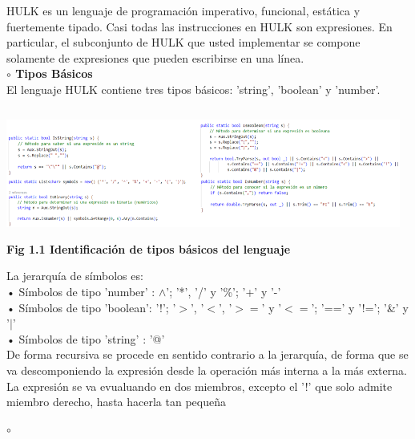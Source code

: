 \documentclass[letterpaper]{article}
\begin{document}
\newpage
{\small
HULK es un lenguaje de programación imperativo, funcional, estática y fuertemente tipado. Casi todas las instrucciones en HULK son expresiones. 
En particular, el subconjunto de HULK que usted implementar se compone solamente de expresiones que pueden escribirse en una línea. \\

\textbf{{\large $\circ $  Tipos Básicos}}\\

El lenguaje HULK contiene tres tipos básicos: 'string', 'boolean' y 'number'.

\begin{center}
	\includegraphics[width=13cm, height=4.25cm]{Imagenes/Types.png}\\
	{\scriptsize \textbf{Fig 1.1 Identificación de tipos básicos del lenguaje}}
\end{center}

La jerarquía de símbolos es: \\
• Símbolos de tipo 'number' : $\wedge$'; '*', '/' y '\%'; '+' y '-' \\
• Símbolos de tipo 'boolean':  '!'; '$>$', '$<$', '$>=$' y '$<=$'; '==' y '!='; '\&' y '$|$' \\
• Símbolos de tipo 'string' : '@' \\

De forma recursiva se procede en sentido contrario a la jerarquía, de forma que se va descomponiendo la expresión desde la operación más interna a la más externa.
La expresión se va evualuando en dos miembros, excepto el '!' que solo admite miembro derecho, hasta hacerla tan pequeña 
  
{\normalsize}

\begin{center}
\end{center}


\textbf{{\large $\circ $ }}\\



\begin{center}
\end{center}


}
\end{document}
